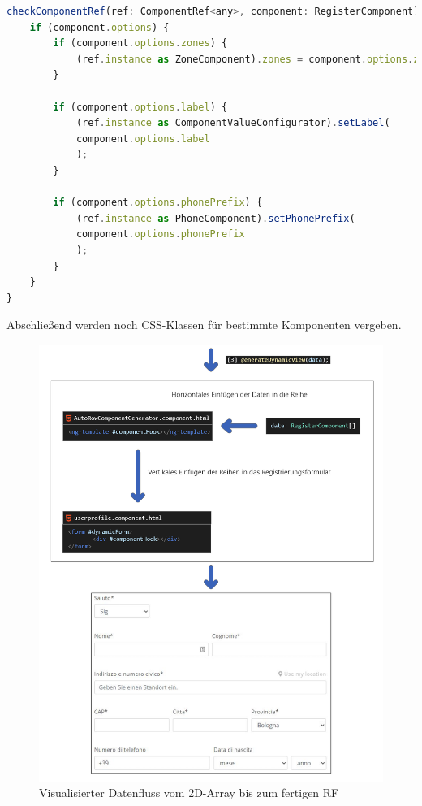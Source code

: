 \begin{lstlisting}[caption={Die \texttt{checkComponentRef()}-Methode der \texttt{AutoRowComponentGenerator}-Klasse}, language=JavaScript,label={lst:ccr}]
checkComponentRef(ref: ComponentRef<any>, component: RegisterComponent) {
	if (component.options) {
		if (component.options.zones) {
			(ref.instance as ZoneComponent).zones = component.options.zones;
		}
		
		if (component.options.label) {
			(ref.instance as ComponentValueConfigurator).setLabel(
			component.options.label
			);
		}
		
		if (component.options.phonePrefix) {
			(ref.instance as PhoneComponent).setPhonePrefix(
			component.options.phonePrefix
			);
		}
	}
}
\end{lstlisting}
\newpage
Abschließend werden noch CSS-Klassen für bestimmte Komponenten vergeben.

\begin{figure}[H]
	\centerline{
		\includegraphics[width=1\textwidth, frame]{./grafiken/RF_Visualisierter Ablauf_2.png}
	}
	\vskip0pt
	\caption{Visualisierter Datenfluss vom 2D-Array bis zum fertigen RF}
\end{figure}

